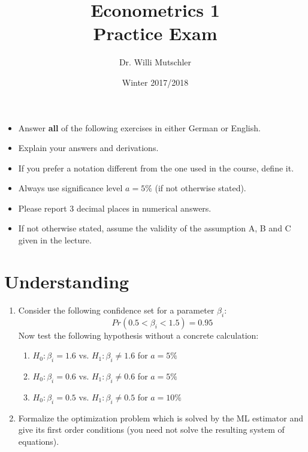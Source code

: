 \documentclass{article}
\begin{document}
	
	\title{Econometrics 1 \\ \small Practice Exam}
	\author{Dr. Willi Mutschler}
	\date{Winter 2017/2018}
	\maketitle
	
	\begin{itemize}
		\item Answer \textbf{all} of the following exercises in either German or English.
		\item Explain your answers and derivations.
		\item If you prefer a notation different from the one used in the course, define it.
		\item Always use significance level $a=5\%$ (if not otherwise stated).
		\item Please report 3 decimal places in numerical answers.
		\item If not otherwise stated, assume the validity of the assumption A, B and C given in the lecture.
	\end{itemize}
\newpage
\section{Understanding}
\begin{enumerate}[label=(\alph*)]
\item Consider the following confidence set for a parameter $\beta_i$:
$$Pr(0.5 < \beta_i < 1.5) = 0.95$$
Now test the following hypothesis without a concrete calculation:
\begin{enumerate}[label=(\roman*)]
	\item $H_0: \beta_i = 1.6$ vs. $H_1:\beta_i \neq 1.6$ for $a=5\%$
	\item $H_0: \beta_i = 0.6$ vs. $H_1:\beta_i \neq 0.6$ for $a=5\%$
	\item $H_0: \beta_i = 0.5$ vs. $H_1:\beta_i \neq 0.5$ for $a=10\%$
\end{enumerate}
\item Formalize the optimization problem which is solved by the ML estimator and give its first order conditions (you need not solve the
resulting system of equations).
\end{enumerate}
\newpage
\end{document}
